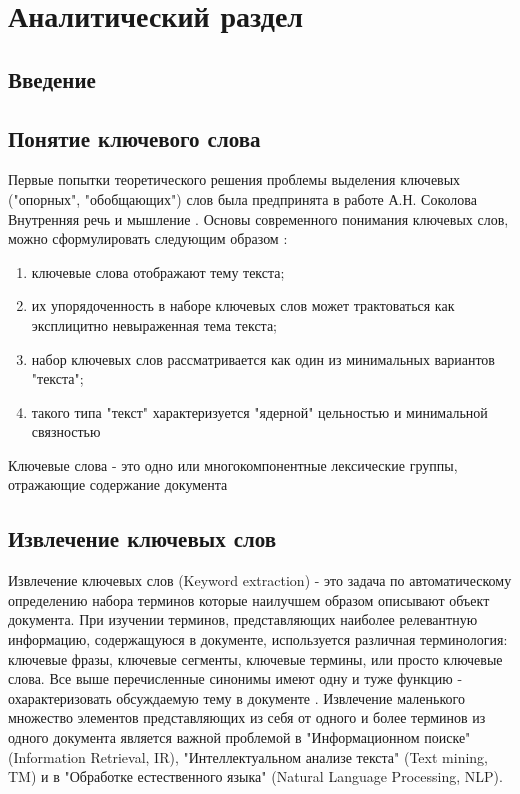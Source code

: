 \section{Аналитический раздел}

\subsection{Введение}

\subsection{Понятие ключевого слова}

Первые попытки теоретического решения проблемы выделения ключевых ("опорных", "обобщающих") слов была предпринята в работе А.Н. Соколова Внутренняя речь и мышление \cite{6}.
Основы современного понимания ключевых слов, можно сформулировать следующим образом \cite{7}:
\begin{enumerate}
	\item ключевые слова отображают тему текста;
	\item их упорядоченность в наборе ключевых слов может трактоваться как эксплицитно невыраженная тема текста;
	\item набор ключевых слов рассматривается как один из минимальных вариантов "текста";
	\item такого типа "текст" характеризуется "ядерной" цельностью и минимальной связностью
\end{enumerate}

Ключевые слова - это одно или многокомпонентные лексические группы, отражающие содержание документа \cite{3}

\subsection{Извлечение ключевых слов}

Извлечение ключевых слов (Keyword extraction) - это задача по автоматическому определению набора терминов которые наилучшем образом описывают объект документа.
При изучении терминов, представляющих наиболее релевантную информацию, содержащуюся в документе, используется различная терминология: ключевые фразы, ключевые сегменты, ключевые термины, или просто ключевые слова.
Все выше перечисленные синонимы имеют одну и туже функцию - охарактеризовать обсуждаемую тему в документе \cite{4}.
Извлечение маленького множество элементов представляющих из себя от одного и более терминов из одного документа является важной проблемой в "Информационном поиске" (Information Retrieval, IR), "Интеллектуальном анализе текста" (Text mining, TM) и в "Обработке естественного языка" (Natural Language Processing, NLP).


